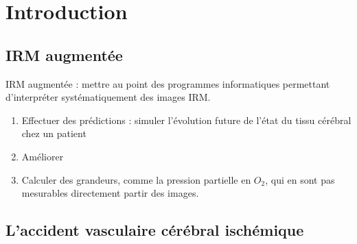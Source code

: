 \section{Introduction}

\subsection{IRM augment\'ee}%



IRM augment\'ee : mettre au point des programmes informatiques permettant d'interpr\'eter syst\'ematiquement des images IRM.
\begin{enumerate}
\item Effectuer des pr\'edictions : simuler l'\'evolution future de l'\'etat du tissu c\'er\'ebral chez un patient%

\item Am\'eliorer 
\item Calculer des grandeurs, comme la pression partielle en $O_2$, qui en sont pas mesurables directement  partir des images.
\end{enumerate}






\subsection{L'accident vasculaire c\'er\'ebral isch\'emique}





